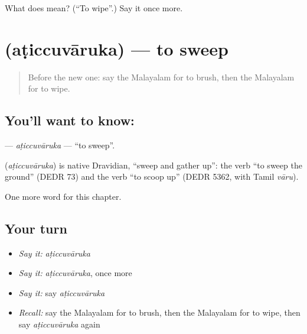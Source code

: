 \begin{tcolorbox}[breakable,colback=teal!4,colframe=teal!35!black,title={Before you move on}]
What does  mean? (\textquotedblleft{}To wipe\textquotedblright{}.) Say it once more.
\end{tcolorbox}
\section[\texorpdfstring{\ml{അടിച്ചുവാരുക} (aṭiccuvāruka)}{അടിച്ചുവാരുക (aṭiccuvāruka)}]{ (aṭiccuvāruka) — to sweep}

\label{lesson:ML-C264-aticcuvaruka}



\begin{quote}
Before the new one: say the Malayalam for to brush, then the Malayalam for to wipe.
\end{quote}

\subsection*{You'll want to know: }
\textbf{} — \emph{aṭiccuvāruka} — \textquotedblleft{}to sweep\textquotedblright{}.

\begin{cousinweb}
\textbf{} (\emph{aṭiccuvāruka}) is native Dravidian, \textquotedblleft{}sweep and gather up\textquotedblright{}: the verb \textquotedblleft{}to sweep the ground\textquotedblright{} (DEDR 73) and the verb \textquotedblleft{}to scoop up\textquotedblright{} (DEDR 5362, with Tamil \emph{vāru}).
\end{cousinweb}

\begin{grammarlens}[title={What you've built}]
One more word for this chapter.
\end{grammarlens}

\subsection*{Your turn}
\begin{itemize}
\raggedright
  \item \emph{Say it:} \emph{aṭiccuvāruka}
  \item \emph{Say it:} \emph{aṭiccuvāruka}, once more
  \item \emph{Say it:} say \emph{aṭiccuvāruka}
  \item \emph{Recall:} say the Malayalam for to brush, then the Malayalam for to wipe, then say \emph{aṭiccuvāruka} again
\end{itemize}

